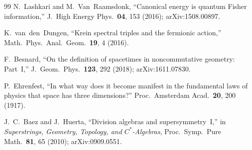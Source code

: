 \documentclass[prl,twocolumn,superscriptaddress,longbibliography]{revtex4-2}
\begin{document}
\begin{thebibliography}{99}
N.~Lashkari and M.~Van~Raamsdonk,
``Canonical energy is quantum Fisher information,''
J.\ High Energy Phys.\ \textbf{04}, 153 (2016);
arXiv:1508.00897.

K.~van~den~Dungen,
``Krein spectral triples and the fermionic action,''
Math.\ Phys.\ Anal.\ Geom.\ \textbf{19}, 4 (2016).

F.~Besnard,
``On the definition of spacetimes in noncommutative
geometry: Part~I,''
J.\ Geom.\ Phys.\ \textbf{123}, 292 (2018);
arXiv:1611.07830.

P.~Ehrenfest,
``In what way does it become manifest in the
fundamental laws of physics that space has three
dimensions?''
Proc.\ Amsterdam Acad.\ \textbf{20}, 200 (1917).

J.~C.~Baez and J.~Huerta,
``Division algebras and supersymmetry~I,''
in \emph{Superstrings, Geometry, Topology,
and $C^*$-Algebras}, Proc.\ Symp.\ Pure Math.\
\textbf{81}, 65 (2010);
arXiv:0909.0551.

\end{thebibliography}
\end{document}
